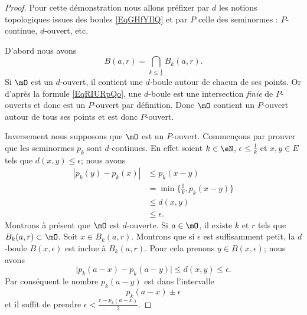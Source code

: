\begin{proof}
    Pour cette démonstration nous allons préfixer par \( d\) les notions topologiques issues des boules \eqref{EqGHfYIlQ} et par \( P\) celle des seminormes : \( P\)-continue, \( d\)-ouvert, etc.

    D'abord nous avons
    \begin{equation}    \label{EqRIURpQo}
        B(a,r)=\bigcap_{k\leq \frac{1}{ k }}B_k(a,r).
    \end{equation}
    Si \( \mO\) est un \( d\)-ouvert, il contient une \( d\)-boule autour de chacun de ses points. Or d'après la formule \eqref{EqRIURpQo}, une \( d\)-boule est une intersection \emph{finie} de \( P\)-ouverts et donc est un \( P\)-ouvert par définition. Donc \( \mO\) contient un \( P\)-ouvert autour de tous ses points et est donc \( P\)-ouvert.

    Inversement nous supposons que \( \mO\) est un \( P\)-ouvert. Commençons par prouver que les seminormes \( p_k\) sont \( d\)-continues. En effet soient \( k\in \eN\), \( \epsilon\leq \frac{1}{ k }\) et \( x,y\in E\) tels que \( d(x,y)\leq \epsilon\); nous avons
    \begin{subequations}
        \begin{align}
            | p_k(y)-p_k(x) |&\leq p_k(x-y)\\
            &=\min\{ \frac{1}{ k },p_k(x-y) \}\\
            &\leq d(x,y)\\
            &\leq \epsilon.
        \end{align}
    \end{subequations}
    Montrons à présent que \( \mO\) est \( d\)-ouverte. Si \( a\in\mO\), il existe \( k\) et \( r\) tels que \( B_k(a,r)\subset\mO\). Soit \( x\in B_k(a,r)\). Montrons que si \( \epsilon\) est suffisamment petit, la \( d\)-boule \( B(x,\epsilon)\) est inclue à \( B_k(a,r)\). Pour cela prenons \( y\in B(x,\epsilon)\); nous avons
    \begin{equation}
        \big| p_k(a-x)-p_k(a-y) \big|\leq d(x,y)\leq \epsilon.
    \end{equation}
    Par conséquent le nombre \( p_k(a-y)\) est dans l'intervalle
    \begin{equation}
        p_k(a-x)\pm\epsilon
    \end{equation}
    et il suffit de prendre \( \epsilon<\frac{ r-p_k(a-x) }{2}\).
\end{proof}

